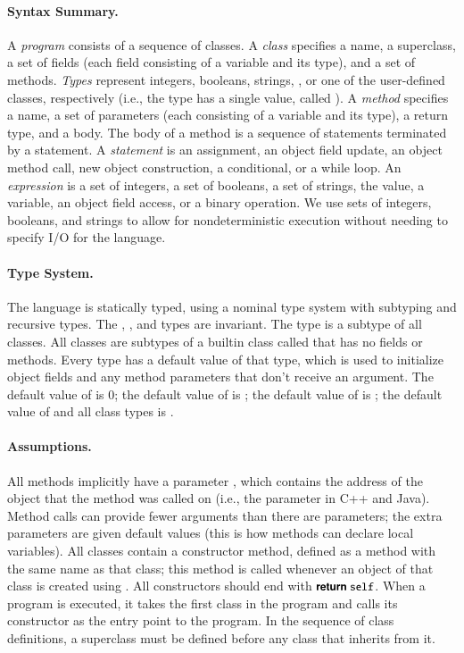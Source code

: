 \documentclass[10pt]{article}
\begin{document}
\paragraph{Syntax Summary.} A \textit{program} consists of a sequence of
classes. A \textit{class} specifies a name, a superclass, a set of
fields (each field consisting of a variable and its type), and a set
of methods. \textit{Types} represent integers, booleans, strings,
, or one of the user-defined classes, respectively (i.e., the
\nullt type has a single value, called ). A \textit{method}
specifies a name, a set of parameters (each consisting of a variable
and its type), a return type, and a body. The body of a method is a
sequence of statements terminated by a  statement. A
\textit{statement} is an assignment, an object field update, an object
method call, new object construction, a conditional, or a while
loop. An \textit{expression} is a set of integers, a set of booleans,
a set of strings, the  value, a variable, an object field
access, or a binary operation. We use sets of integers, booleans, and
strings to allow for nondeterministic execution without needing to
specify I/O for the language.

\paragraph{Type System.} The language is statically typed, using a
nominal type system with subtyping and recursive types. The \intt,
\boolt, and \strt types are invariant. The \nullt type is a subtype of
all classes. All classes are subtypes of a builtin class called
\TopClass that has no fields or methods. Every type has a default
value of that type, which is used to initialize object fields and any
method parameters that don't receive an argument. The default value of
\intt is 0; the default value of \boolt is \false; the default value
of \strt is ; the default value of \nullt and all class types
is .

\paragraph{Assumptions.} All methods implicitly have a parameter
\self, which contains the address of the object that the method was
called on (i.e., the  parameter in C++ and Java). Method
calls can provide fewer arguments than there are parameters; the extra
parameters are given default values (this is how methods can declare
local variables). All classes contain a constructor method, defined as
a method with the same name as that class; this method is called
whenever an object of that class is created using . All
constructors should end with $\mbox{\sffamily{\bfseries\small {return }}}\mbox{\small \texttt{self}}$. When a program is
executed, it takes the first class in the program and calls its
constructor as the entry point to the program. In the sequence of
class definitions, a superclass must be defined before any class that
inherits from it.
\end{document}
